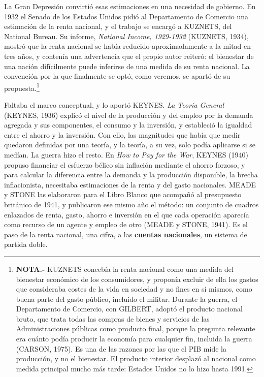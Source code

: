 \documentclass[10pt,a4paper]{article}
\begin{document}
La Gran Depresión convirtió esas estimaciones en una necesidad de gobierno. En 1932 el Senado de los Estados Unidos pidió al Departamento de Comercio una estimación de la renta nacional, y el trabajo se encargó a KUZNETS, del National Bureau. Su informe, \textit{National Income, 1929-1932} (KUZNETS, 1934), mostró que la renta nacional se había reducido aproximadamente a la mitad en tres años, y contenía una advertencia que el propio autor reiteró: el bienestar de una nación difícilmente puede inferirse de una medida de su renta nacional. La convención por la que finalmente se optó, como veremos, se apartó de su propuesta.\footnote{%
    \textbf{NOTA.-} KUZNETS concebía la renta nacional como una medida del bienestar económico de los consumidores, y proponía excluir de ella los gastos que consideraba costes de la vida en sociedad y no fines en sí mismos, como buena parte del gasto público, incluido el militar. Durante la guerra, el Departamento de Comercio, con GILBERT, adoptó el producto nacional bruto, que trata todas las compras de bienes y servicios de las Administraciones públicas como producto final, porque la pregunta relevante era cuánto podía producir la economía para cualquier fin, incluida la guerra (CARSON, 1975). Es una de las razones por las que el PIB mide la producción, y no el bienestar. El producto interior desplazó al nacional como medida principal mucho más tarde: Estados Unidos no lo hizo hasta 1991.
}

Faltaba el marco conceptual, y lo aportó KEYNES. \textit{La Teoría General} (KEYNES, 1936) explicó el nivel de la producción y del empleo por la demanda agregada y sus componentes, el consumo y la inversión, y estableció la igualdad entre el ahorro y la inversión. Con ello, las magnitudes que había que medir quedaron definidas por una teoría, y la teoría, a su vez, solo podía aplicarse si se medían. La guerra hizo el resto. En \textit{How to Pay for the War}, KEYNES (1940) propuso financiar el esfuerzo bélico sin inflación mediante el ahorro forzoso, y para calcular la diferencia entre la demanda y la producción disponible, la brecha inflacionista, necesitaba estimaciones de la renta y del gasto nacionales. MEADE y STONE las elaboraron para el Libro Blanco que acompañó al presupuesto británico de 1941, y publicaron ese mismo año el método: un conjunto de cuadros enlazados de renta, gasto, ahorro e inversión en el que cada operación aparecía como recurso de un agente y empleo de otro (MEADE y STONE, 1941). Es el paso de la renta nacional, una cifra, a las \textbf{cuentas nacionales}, un sistema de partida doble.
\end{document}
